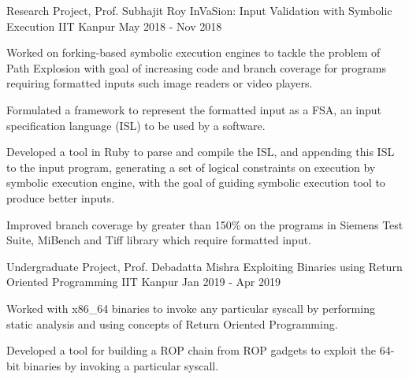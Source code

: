 

\begin{cventries}

  \cventry
    {Research Project, Prof. Subhajit Roy} %
    {InVaSion: Input Validation with Symbolic Execution} %
    {IIT Kanpur} %
    {May 2018 - Nov 2018} %
    {
      \begin{cvitems} %
      \item {Worked on forking-based symbolic execution engines to tackle the problem of Path Explosion with goal of increasing code and branch coverage for programs requiring formatted inputs such image readers or video players.}
      \item {Formulated a framework to represent the formatted input as a FSA, an input specification language (ISL) to be used by a software.}
        \item {Developed a tool in Ruby to parse and compile the ISL, and appending this ISL to the input program, generating a set of logical constraints on execution by symbolic execution engine, with the goal of guiding symbolic execution tool to produce better inputs.}
        \item {Improved branch coverage by greater than 150\% on the programs in Siemens Test Suite, MiBench and Tiff library which require formatted input.}
      \end{cvitems}
    }



  \cventry
    {Undergraduate Project, Prof. Debadatta Mishra} %
    {Exploiting Binaries using Return Oriented Programming} %
    {IIT Kanpur} %
    {Jan 2019 - Apr 2019} %
    {
      \begin{cvitems} %
        \item {Worked with x86\_64 binaries to invoke any particular syscall by performing static analysis and using concepts of Return Oriented Programming.}
        \item {Developed a tool for building a ROP chain from ROP gadgets to exploit the 64-bit binaries by invoking a particular syscall.}
      \end{cvitems}
    }


\end{cventries}
